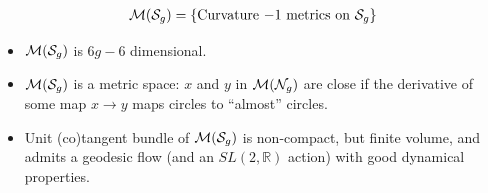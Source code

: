 \begin{frame}
  \begin{align*}
    \mathcal{M}(\mathcal{S}_g) = \left\{ \text{Curvature $-1$ metrics on $\mathcal{S}_g$} \right\}
  \end{align*}
  \begin{itemize}
  \item<2-> $\mathcal{M}(\mathcal{S}_g)$ is $6g-6$ dimensional.
  \item<3-> $\mathcal{M}(\mathcal{S}_g)$ is a metric space: $x$ and $y$ in $\mathcal{M}(\mathcal{N}_g)$ are close if the derivative of some map $x \to y$ maps circles to ``almost'' circles.
  \item<4-> Unit (co)tangent bundle of $\mathcal{M}(\mathcal{S}_g)$ is non-compact, but finite volume, and admits a geodesic flow (and an $SL(2, \mathbb{R})$ action) with good dynamical properties.
  \end{itemize}
\end{frame}

